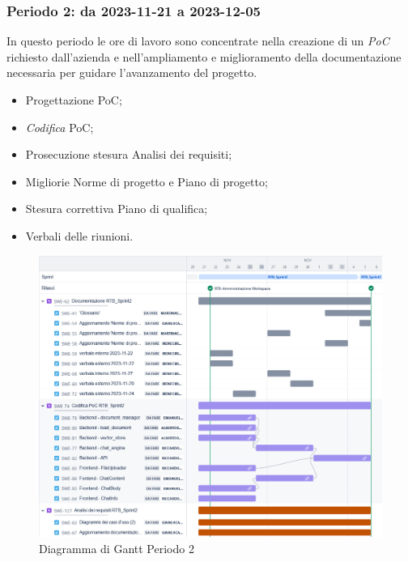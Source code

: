 \documentclass[10pt, a4paper]{article}
\begin{document}
\subsubsection{Periodo 2: da 2023-11-21 a 2023-12-05}
In questo periodo le ore di lavoro sono concentrate nella creazione di un \textit{PoC\pg} richiesto dall'azienda e nell'ampliamento e miglioramento della documentazione necessaria per guidare l'avanzamento del progetto.
\begin{itemize}
    \item Progettazione PoC;
    \item \textit{Codifica\pg} PoC;
    \item Prosecuzione stesura Analisi dei requisiti;
    \item Migliorie Norme di progetto e Piano di progetto;
    \item Stesura correttiva Piano di qualifica;
    \item Verbali delle riunioni.
  
\end{itemize}
\vspace{1em}

 \begin{figure}[H]
        \centering        
        \includegraphics[width=15.5cm]{gantt/ganttPeriodo2.png}
        \caption{Diagramma di Gantt Periodo 2 }
    \end{figure}
\newpage
\end{document}
